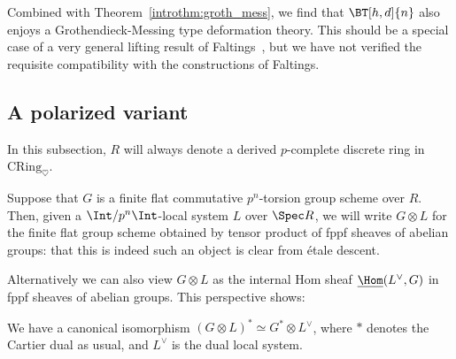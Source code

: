 \documentclass[10pt]{amsart}
\begin{document}
\begin{remark}
\label{rem:groth_messing_faltings}
Combined with Theorem~\ref{introthm:groth_mess}, we find that $\BT[h,d]{n}$ also enjoys a Grothendieck-Messing type deformation theory. This should be a special case of a very general lifting result of Faltings~\cite[Theorem 17]{Faltings2002-mp}, but we have not verified the requisite compatibility with the constructions of Faltings.
\end{remark}

\subsection{A polarized variant}
\label{subsec:polarized}

In this subsection, $R$ will always denote a derived $p$-complete discrete ring in $\mathrm{CRing}_{\heartsuit}$. 

\begin{definition}
\label{defn:twist_by_loc_system}
Suppose that $G$ is a finite flat commutative $p^n$-torsion group scheme over $R$. Then, given a $\Int/p^n\Int$-local system $L$ over $\Spec R$, we will write $G\otimes L$ for the finite flat group scheme obtained by tensor product of fppf sheaves of abelian groups: that this is indeed such an object is clear from \'etale descent.
\end{definition}


Alternatively we can also view $G\otimes L$ as the internal Hom sheaf $\underline{\Hom}(L^\vee,G)$ in fppf sheaves of abelian groups. This perspective shows:
\begin{observation}
\label{obs:cartier_dual_twisting}
We have a canonical isomorphism $(G\otimes L)^* \simeq G^*\otimes L^\vee$, where $*$ denotes the Cartier dual as usual, and $L^\vee$ is the dual local system.
\end{observation}
\end{document}
